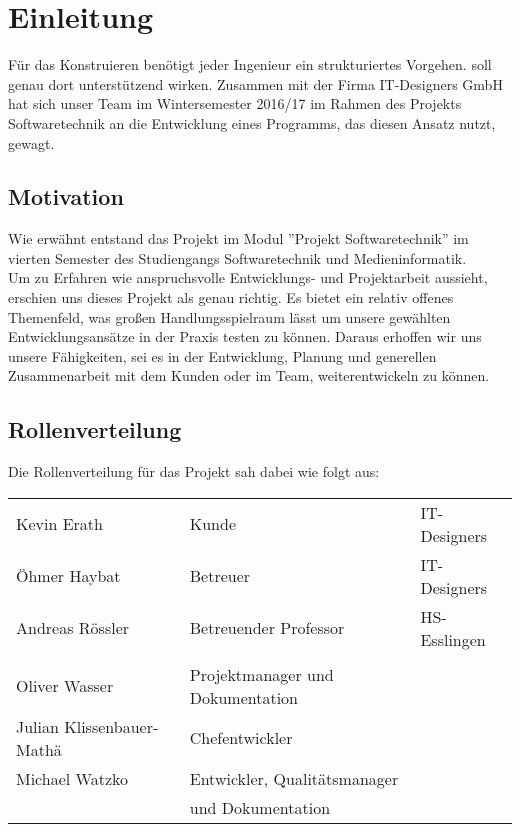 
\section{Einleitung}

Für das Konstruieren benötigt jeder Ingenieur ein strukturiertes Vorgehen. \textFlowDesign{}
soll genau dort unterstützend wirken.
Zusammen mit der Firma IT-Designers GmbH hat sich unser Team im Wintersemester 2016/17 im
Rahmen des Projekts Softwaretechnik an die Entwicklung eines Programms, das diesen Ansatz
nutzt, gewagt.

\subsection{Motivation}
Wie erwähnt entstand das Projekt \textFlowDesign{} im Modul ''Projekt Softwaretechnik'' im vierten Semester des Studiengangs Softwaretechnik und Medieninformatik. \\
Um zu Erfahren wie anspruchsvolle Entwicklungs- und Projektarbeit aussieht, erschien uns dieses Projekt als genau richtig. Es bietet ein relativ offenes Themenfeld, was großen Handlungsspielraum lässt um unsere gewählten Entwicklungsansätze in der Praxis testen zu können. Daraus erhoffen wir uns unsere Fähigkeiten, sei es in der Entwicklung, Planung und generellen Zusammenarbeit mit dem Kunden oder im Team, weiterentwickeln zu können.


\subsection{Rollenverteilung}
Die Rollenverteilung für das Projekt sah dabei wie folgt aus:

\begin{center}
	\begin{tabular}{l|l l}
		Kevin Erath & Kunde     & IT-Designers \\
		Öhmer Haybat & Betreuer & IT-Designers \\
		Andreas Rössler & Betreuender Professor & HS-Esslingen \\
		\\
		Oliver Wasser             & Projektmanager und Dokumentation & \\
		Julian Klissenbauer-Mathä & Chefentwickler & \\
		Michael Watzko            & Entwickler, Qualitätsmanager  \\
		                          & und Dokumentation \\
	\end{tabular}
\end{center}

